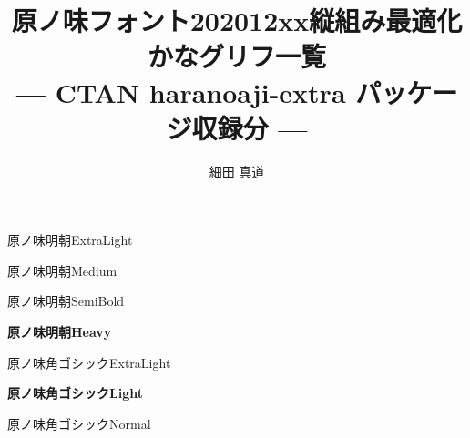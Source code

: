 \documentclass[dvipdfmx]{jsarticle}
\title{原ノ味フォント202012xx縦組み最適化かなグリフ一覧\\
--- CTAN haranoaji-extra パッケージ収録分 ---}
\author{細田 真道}
\begin{document}
\maketitle
{}

\clearpage
\parindent=0pt
\fboxsep=0pt

\mcfamily\ltseries
{\huge 原ノ味明朝\textmd{ExtraLight}}

\testAll

\clearpage

\mcfamily\mdseries
{\huge 原ノ味明朝\textmd{Medium}}

\testAll

\clearpage

\mgfamily %
{\huge 原ノ味明朝\textmd{SemiBold}}

\testAll

\clearpage

\mcfamily\bfseries
{\huge 原ノ味明朝\textmd{Heavy}}

\testAll

\clearpage

\gtfamily\mdseries
{\huge 原ノ味角ゴシック\textmd{ExtraLight}}

\testAll

\clearpage

\gtfamily\bfseries
{\huge 原ノ味角ゴシック\textmd{Light}}

\testAll

\clearpage

\gtfamily\ebseries
{\huge 原ノ味角ゴシック\textmd{Normal}}

\testAll
\end{document}

